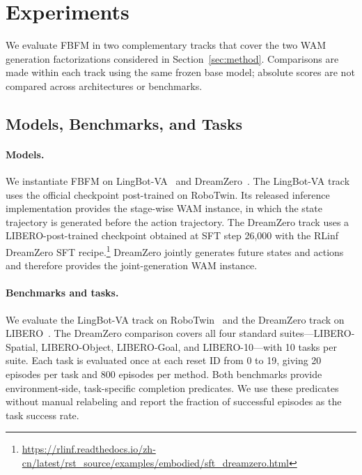 
\section{Experiments}
\label{sec:experiments}


We evaluate FBFM in two complementary tracks that cover the two WAM generation
factorizations considered in Section~\ref{sec:method}. Comparisons are made
within each track using the same frozen base model; absolute scores are not
compared across architectures or benchmarks.

\subsection{Models, Benchmarks, and Tasks}
\label{subsec:models-benchmarks-tasks}

\paragraph{Models.}
We instantiate FBFM on LingBot-VA~\cite{li2026lingbot} and
DreamZero~\cite{ye2026dreamzero}. The LingBot-VA track uses the official
checkpoint post-trained on RoboTwin. Its released inference implementation
provides the stage-wise WAM instance, in which the state trajectory is
generated before the action trajectory. The DreamZero track uses a
LIBERO-post-trained checkpoint obtained at SFT step 26,000 with the RLinf
DreamZero SFT
recipe.\footnote{\url{https://rlinf.readthedocs.io/zh-cn/latest/rst_source/examples/embodied/sft_dreamzero.html}}
DreamZero jointly generates future states and actions and therefore provides
the joint-generation WAM instance.

\paragraph{Benchmarks and tasks.}
We evaluate the LingBot-VA track on RoboTwin~\cite{mu2025robotwin} and the
DreamZero track on LIBERO~\cite{liu2023libero}. The DreamZero comparison covers
all four standard suites---LIBERO-Spatial, LIBERO-Object,
LIBERO-Goal, and LIBERO-10---with 10 tasks per suite. Each task is evaluated
once at each reset ID from 0 to 19, giving 20 episodes per task and 800 episodes
per method.
Both benchmarks provide environment-side, task-specific completion predicates.
We use these predicates without manual relabeling and report the fraction of
successful episodes as the task success rate.

